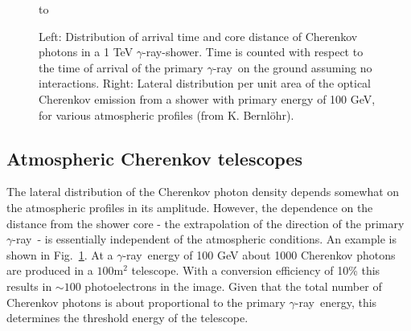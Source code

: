 \documentclass{svjour3x}                     %
\newcommand{\gr}{$\gamma$-ray}
\newcommand{\byKB}{ (from K. Bernl\"ohr)}
\begin{document}
\begin{figure}[ht]
  \hbox to 
  \caption[Arrival time and lateral distribution]{Left: Distribution of arrival time and core distance of
     Cherenkov photons in a 1 TeV \gr-shower. Time is counted with respect
     to the time of arrival of the primary \gr\ on the ground 
     assuming no interactions. 
   Right: Lateral distribution per unit area of the optical Cherenkov emission
    from a shower with primary energy of 100 GeV, for various atmospheric
    profiles\byKB.}
\label{fig:4.2}       %
\end{figure}
%

\subsection{Atmospheric Cherenkov telescopes}
\label{sec:2.2}

The lateral distribution of the Cherenkov photon density depends somewhat on
the atmospheric profiles in its amplitude. However, the dependence on the
distance from the shower core - the extrapolation of the direction of the
primary \gr\ - is essentially independent of the atmospheric conditions. An
example is shown in Fig.~\ref{fig:4.2}. At a \gr\ energy of 100 GeV about 1000
Cherenkov photons are produced in a $100 \mathrm{m}^2$ telescope. With a
conversion efficiency of 10\% this results in $\sim 100$ photoelectrons in the
image. Given that the total number of Cherenkov photons is about proportional
to the primary \gr\ energy, this determines the threshold energy of the
telescope.
\end{document}
